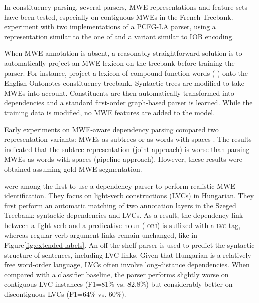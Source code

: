 \documentclass[output=paper]{LSP/langsci}
\begin{document}
In constituency parsing, several parsers, MWE representations and feature sets have been tested, especially on contiguous MWEs in the French Treebank. 
\citet{constant13} experiment with two implementations of a PCFG-LA parser, using a representation similar to the one of \citet{green11} and a variant similar to IOB encoding.

When MWE annotation is absent, a reasonably straightforward solution is to automatically project an MWE lexicon on the treebank before training the parser.
For instance, \citet{kato16.422} project a lexicon of compound function words (\eg{} ) onto the English Ontonotes constituency treebank. 
Syntactic trees are modified to take MWEs into account.
Constituents are then automatically transformed into dependencies and a standard first-order graph-based parser is learned.
While the training data is modified, no MWE features are added to the model.

Early experiments on MWE-aware dependency parsing compared two representation variants: MWEs as subtrees or as words with spaces \citep{nivre04b}.
The results indicated that the subtree representation (joint approach) is worse than parsing MWEs as words with spaces (pipeline approach).
However, these results were obtained assuming gold MWE segmentation. %

\citet{vincze13} were among the first to use a dependency parser to perform realistic MWE identification.
They focus on light-verb constructions (LVCs) in Hungarian.
They first perform an automatic matching of two annotation layers in the Szeged Treebank: syntactic dependencies and LVCs.
As a result, the  dependency link between a light verb and a predicative noun (\eg{} {\scshape obj}) is suffixed with a {\scshape lvc} tag, whereas regular verb-argument links remain unchanged, like in Figure\ref{fig:extended-labels}. An off-the-shelf parser is used to predict the syntactic structure of sentences, including LVC links.
Given that Hungarian is a relatively free word-order language, LVCs often involve long-distance dependencies.
When compared with a classifier baseline, the parser performs slightly worse on contiguous LVC instances (F1=81\% vs. 82.8\%) but considerably better on discontiguous LVCs (F1=64\% vs. 60\%).
\end{document}
